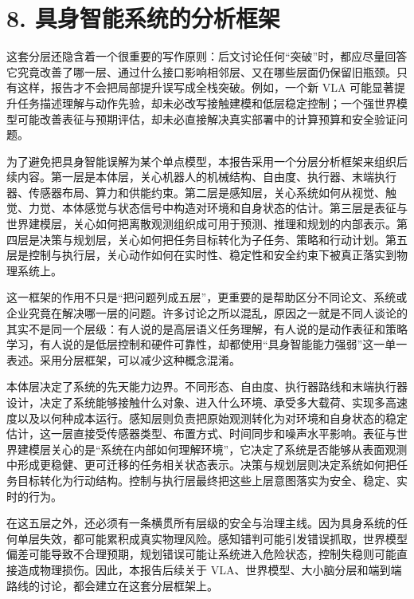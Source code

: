 \section*{8. 具身智能系统的分析框架}

这套分层还隐含着一个很重要的写作原则：后文讨论任何“突破”时，都应尽量回答它究竟改善了哪一层、通过什么接口影响相邻层、又在哪些层面仍保留旧瓶颈。只有这样，报告才不会把局部提升误写成全栈突破。例如，一个新 VLA 可能显著提升任务描述理解与动作先验，却未必改写接触建模和低层稳定控制；一个强世界模型可能改善表征与预期评估，却未必直接解决真实部署中的计算预算和安全验证问题。

为了避免把具身智能误解为某个单点模型，本报告采用一个分层分析框架来组织后续内容。第一层是本体层，关心机器人的机械结构、自由度、执行器、末端执行器、传感器布局、算力和供能约束。第二层是感知层，关心系统如何从视觉、触觉、力觉、本体感觉与状态信号中构造对环境和自身状态的估计。第三层是表征与世界建模层，关心如何把离散观测组织成可用于预测、推理和规划的内部表示。第四层是决策与规划层，关心如何把任务目标转化为子任务、策略和行动计划。第五层是控制与执行层，关心动作如何在实时性、稳定性和安全约束下被真正落实到物理系统上。

这一框架的作用不只是“把问题列成五层”，更重要的是帮助区分不同论文、系统或企业究竟在解决哪一层的问题。许多讨论之所以混乱，原因之一就是不同人谈论的其实不是同一个层级：有人说的是高层语义任务理解，有人说的是动作表征和策略学习，有人说的是低层控制和硬件可靠性，却都使用“具身智能能力强弱”这一单一表述。采用分层框架，可以减少这种概念混淆。

本体层决定了系统的先天能力边界。不同形态、自由度、执行器路线和末端执行器设计，决定了系统能够接触什么对象、进入什么环境、承受多大载荷、实现多高速度以及以何种成本运行。感知层则负责把原始观测转化为对环境和自身状态的稳定估计，这一层直接受传感器类型、布置方式、时间同步和噪声水平影响。表征与世界建模层关心的是“系统在内部如何理解环境”，它决定了系统是否能够从表面观测中形成更稳健、更可迁移的任务相关状态表示。决策与规划层则决定系统如何把任务目标转化为行动结构。控制与执行层最终把这些上层意图落实为安全、稳定、实时的行为。

在这五层之外，还必须有一条横贯所有层级的安全与治理主线。因为具身系统的任何单层失效，都可能累积成真实物理风险。感知错判可能引发错误抓取，世界模型偏差可能导致不合理预期，规划错误可能让系统进入危险状态，控制失稳则可能直接造成物理损伤。因此，本报告后续关于 VLA、世界模型、大小脑分层和端到端路线的讨论，都会建立在这套分层框架上。

